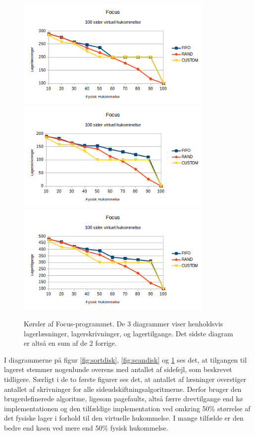\begin{figure}[H]
	\centering
	\includegraphics[width=0.85\textwidth]{figures/FocusReads.png}	\includegraphics[width=0.85\textwidth]{figures/FocusWrites.png}	\includegraphics[width=0.85\textwidth]{figures/FocusAccess.png}
	\caption{Kørsler af Focus-programmet. De 3 diagrammer viser henholdsvis lagerlæsninger, lagerskrivninger, og lagertilgange. Det sidste diagram er altså en sum af de 2 forrige.}
	\label{fig:focusdisk}
\end{figure}

I diagrammerne på figur \ref{fig:sortdisk}, \ref{fig:scandisk} og \ref{fig:focusdisk} ses det, at tilgangen til lageret stemmer nogenlunde overens med antallet af sidefejl, som beskrevet tidligere. Særligt i de to første figurer ses det, at antallet af læsninger overstiger antallet af skrivninger for alle sideudskiftningsalgoritmerne. Derfor bruger den brugerdefinerede algoritme, ligesom pagefaults, altså færre drevtilgange end kø implementationen og den tilfældige implementation ved omkring 50\% størrelse af det fysiske lager i forhold til den virtuelle hukommelse. I mange tilfælde er den bedre end køen ved mere end 50\% fysisk hukommelse.
